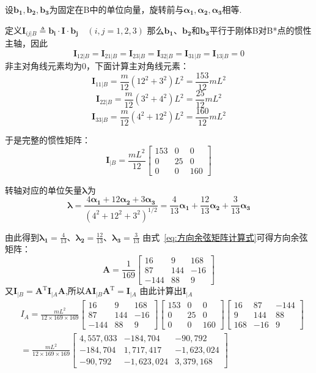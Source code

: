 \begin{solution}
    设$\bm{b_1}, \bm{b_2}, \bm{b_3}$为固定在B中的单位向量，旋转前与$\bm{\alpha_1}, \bm{\alpha_2}, \bm{\alpha_3}$相等.

    定义$\bm{I}_{ij|B}\triangleq\bm{b_i} \cdot \bm{I} \cdot \bm{b_j} \quad(i,j=1,2,3)$
    那么$\bm{b_1}$、$\bm{b_2}$和$\bm{b_3}$平行于刚体B对B*点的惯性主轴，因此
    $$\bm{I}_{12|B}=\bm{I}_{21|B}=\bm{I}_{23|B}=\bm{I}_{32|B}=\bm{I}_{31|B}=\bm{I}_{13|B}=0$$
    非主对角线元素均为0，下面计算主对角线元素：
    $$\bm{I}_{11|B}=\frac{m}{12}(12^{2}+3^{2})L^{2}=\frac{153}{12}mL^{2}$$
    $$\bm{I}_{22|B}=\frac{m}{12}(3^2+4^2)L^2=\frac{25}{12}mL^2$$
    $$\bm{I}_{33|B}=\frac{m}{12}(4^2+12^2)L^2=\frac{160}{12}mL^2$$

    于是完整的惯性矩阵：$$\bm{I}_{|B}=\frac{mL^2}{12}\begin{bmatrix}153&0&0\\0&25&0\\0&0&160\end{bmatrix}$$

    转轴对应的单位矢量$\bm{\lambda}$为$$\bm{\lambda}=\frac{4\bm{\alpha_1}+12\bm{\alpha_2}+3\bm{\alpha_3}}{(4^{2}+12^{2}+3^{2})^{1/2}}=\frac{4}{13}\bm{\alpha_1}+\frac{12}{13}\bm{\alpha_2}+\frac{3}{13}\bm{\alpha_3}$$

    由此得到$\bm{\lambda_1}=\frac{4}{13}$、$\bm{\lambda_2}=\frac{12}{13}$、$\bm{\lambda_3}=\frac{3}{13}$
    由式~\eqref{eq:方向余弦矩阵计算式}可得方向余弦矩阵：
    $$\bm{A}=\frac{1}{169}\begin{bmatrix}16&9&168\\87&144&-16\\-144&88&9\end{bmatrix}$$
    又$\bm{I}_{|B}=\bm{A}^\mathrm{T}\bm{I}_{|A} \bm{A}$,所以$\bm{A}\bm{I}_{|B} \bm{A}^\mathrm{T}=\bm{I}_{|A} $
    由此计算出$\bm{I}_{|A}$
    $$\begin{aligned}
        &I_{A}=\frac{mL^{2}}{12\times169\times169}\begin{bmatrix}16&9&168\\87&144&-16\\-144&88&9\end{bmatrix}\begin{bmatrix}153&0&0\\0&25&0\\0&0&160\end{bmatrix}\begin{bmatrix}16&87&-144\\9&144&88\\168&-16&9\end{bmatrix}\\&=\frac{mL^{2}}{12\times169\times169}\begin{bmatrix}4,557,033&-184,704&-90,792\\-184,704&1,717,417&-1,623,024\\-90,792&-1,623,024&3,379,168\end{bmatrix}
    \end{aligned}$$

\end{solution}
